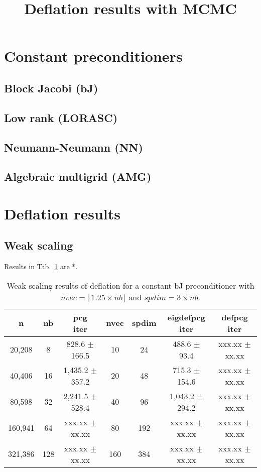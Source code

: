 \documentclass{article}
\title{Deflation results with MCMC}
\begin{document}
\maketitle

\section{Constant preconditioners}

\subsection{Block Jacobi (bJ)}

\subsection{Low rank (LORASC)}

\subsection{Neumann-Neumann (NN)}

\subsection{Algebraic multigrid (AMG)}

\section{Deflation results}

\subsection{Weak scaling}
Results in Tab.~\ref{Tab:005} are *.


\begin{table}[ht]
	\caption{Weak scaling results of deflation for a constant bJ preconditioner with $nvec=\lfloor1.25\times nb\rfloor$ and $spdim=3\times nb$.}
	\centering
	\begin{tabular}{|c|c|c|c|c|c|c|}
		\hline
		n & nb & \makecell{pcg\\ iter} & nvec & spdim & \makecell{eigdefpcg\\ iter} & \makecell{defpcg\\ iter}\\
		\hline
		20,208  &   8 &   828.6 $\pm$ 166.5 &  10 &  24 &   488.6 $\pm$  93.4 & xxx.xx $\pm$ xx.xx \\
		40,406  &  16 & 1,435.2 $\pm$ 357.2 &  20 &  48 &   715.3 $\pm$ 154.6 & xxx.xx $\pm$ xx.xx \\
		80,598  &  32 & 2,241.5 $\pm$ 528.4 &  40 &  96 & 1,043.2 $\pm$ 294.2 & xxx.xx $\pm$ xx.xx \\
		160,941 &  64 & xxx.xx $\pm$ xx.xx &  80 & 192 & xxx.xx $\pm$ xx.xx & xxx.xx $\pm$ xx.xx \\
		321,386 & 128 & xxx.xx $\pm$ xx.xx & 160 & 384 & xxx.xx $\pm$ xx.xx & xxx.xx $\pm$ xx.xx \\
		\hline
	\end{tabular}
	\label{Tab:005}
\end{table}
\end{document}
